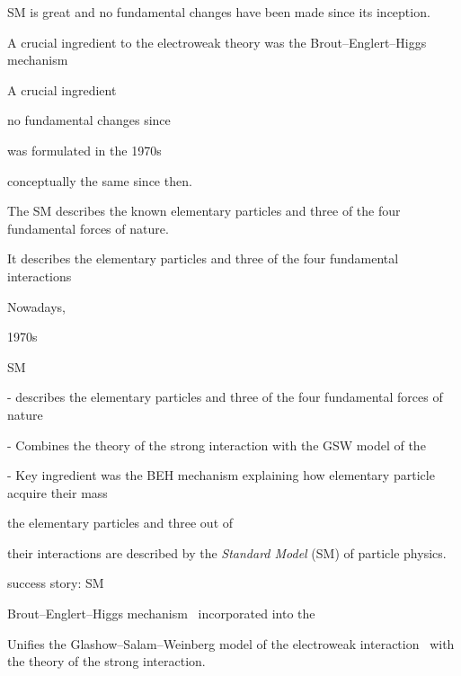 SM is great and no fundamental changes have been made since its inception.

A crucial ingredient to the electroweak theory was the Brout--Englert--Higgs
mechanism


A crucial ingredient


no fundamental changes since

was formulated in the 1970s

conceptually the same since then.



The SM describes the known
elementary particles and three of the four fundamental forces of nature.





It describes the elementary particles and three of the four fundamental
interactions







Nowadays,

1970s

SM

- describes the elementary particles and three of the four fundamental forces of nature

- Combines the theory of the strong interaction with the GSW model of the

- Key ingredient was the BEH mechanism explaining how elementary particle acquire their mass



the elementary particles and three out of



their interactions are described by the
\emph{Standard Model} (SM) of particle physics.






success story: SM



Brout--Englert--Higgs mechanism~\cite{Englert:1964et,Higgs:1964pj} incorporated
into the


Unifies the Glashow--Salam--Weinberg model of the electroweak
interaction~ with the theory
of the strong interaction.



